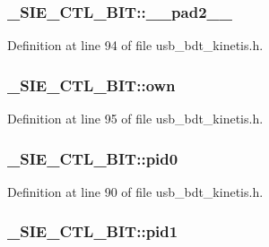 \subsubsection[{\texorpdfstring{\+\_\+\+\_\+pad2\+\_\+\+\_\+}{__pad2__}}]{ \+\_\+\+S\+I\+E\+\_\+\+C\+T\+L\+\_\+\+B\+I\+T\+::\+\_\+\+\_\+pad2\+\_\+\+\_\+}\hypertarget{struct___s_i_e___c_t_l___b_i_t_abe310946d64b07e6a852c88b3e7eccbb}{}\label{struct___s_i_e___c_t_l___b_i_t_abe310946d64b07e6a852c88b3e7eccbb}


Definition at line 94 of file usb\+\_\+bdt\+\_\+kinetis.\+h.

\subsubsection[{\texorpdfstring{own}{own}}]{ \+\_\+\+S\+I\+E\+\_\+\+C\+T\+L\+\_\+\+B\+I\+T\+::own}\hypertarget{struct___s_i_e___c_t_l___b_i_t_a15e9dce6adb1492773bf669c677c4f69}{}\label{struct___s_i_e___c_t_l___b_i_t_a15e9dce6adb1492773bf669c677c4f69}


Definition at line 95 of file usb\+\_\+bdt\+\_\+kinetis.\+h.

\subsubsection[{\texorpdfstring{pid0}{pid0}}]{ \+\_\+\+S\+I\+E\+\_\+\+C\+T\+L\+\_\+\+B\+I\+T\+::pid0}\hypertarget{struct___s_i_e___c_t_l___b_i_t_a0b5e23e6030cbc40b1435185eee883b5}{}\label{struct___s_i_e___c_t_l___b_i_t_a0b5e23e6030cbc40b1435185eee883b5}


Definition at line 90 of file usb\+\_\+bdt\+\_\+kinetis.\+h.

\subsubsection[{\texorpdfstring{pid1}{pid1}}]{ \+\_\+\+S\+I\+E\+\_\+\+C\+T\+L\+\_\+\+B\+I\+T\+::pid1}\hypertarget{struct___s_i_e___c_t_l___b_i_t_a18fdff82280502521ab7c3fc987c77d2}{}\label{struct___s_i_e___c_t_l___b_i_t_a18fdff82280502521ab7c3fc987c77d2}


